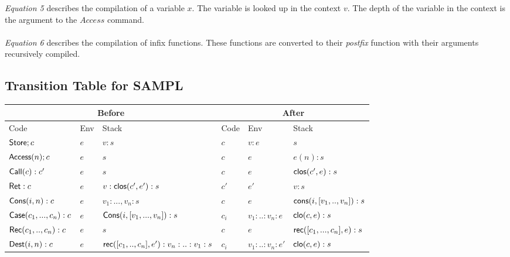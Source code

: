 \documentclass[11pt]{article}
\newcommand{\<}{\langle}
\renewcommand{\>}{\rangle}
\begin{document}
{\em Equation 5} describes the compilation of a variable $x$. The variable is looked up in the context $v$. The depth of the variable in the context is the argument to the $Access$ command.
~~\\~~\\
{\em Equation 6} describes the compilation of infix functions. These functions are converted to their {\em postfix} function with their arguments recursively compiled.
\subsection {Transition Table for SAMPL}

\begin{table}
\begin{center}
    \begin{tabular}{|l|l|l||l|l|l|}
    \hline 
      \multicolumn{3}{|c||}{Before} 
     & \multicolumn{3}{c|}{After} \\ \hline    
   Code   & Env  & Stack      
                      &Code   & Env  & Stack     \\ \hline
         ${\sf Store};c$   &$ e$    & $v:s$          
                     & $c$           & $v:e$    & $s$     \\ \hline   
        ${\sf Access}(n);c$   &$ e$    & $s$          
                     & $c$           & $e$    & $e(n):s$     \\ \hline    
      ${\sf Call}(c):c'$         & $e$    & $s$  
                     & $c$          & $e$   & ${\sf clos}(c',e):s$        \\ \hline              
    ${\sf Ret}:c$         & $e$    & $v:{\sf clos}(c',e'):s$  
                     & $c'$          & $e'$   & $v:s$        \\ \hline \hline  
         ${\sf Cons}(i,n):c $ & $e$    & $v_1:...,v_n:s$      
                     & $c$           &$ e$    & ${\sf cons}(i,[v_1,..,v_n]):s$    \\ \hline      
          ${\sf Case}(c_1,...,c_n):c $ & $e$ & ${\sf Cons}(i,[v_1,...,v_n]):s$ 
                     & $c_i$ & $v_1:..:v_n:e$ & ${\sf clo}(c,e):s$ \\ \hline \hline
     ${\sf Rec}(c_1,..,c_n):c$      & $e$   & $s$         
                     & $c$           & $e$    & ${\sf rec}([c_1,...,c_n],e):s$    \\ \hline
     ${\sf Dest}(i,n):c$         & $e$    & ${\sf rec}([c_1,..,c_n],e'):v_n:..:v_1:s$ 
                     & $ c_i$          & $v_1:..:v_n:e'$  & ${\sf clo}(c,e):s$      \\ \hline \hline

\end{tabular}
\end{center}
\end{table}
\end{document}
